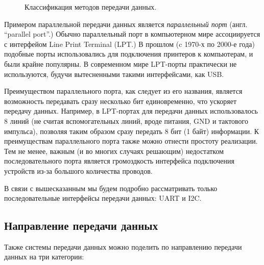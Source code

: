 \documentclass[../sparc.tex]{subfiles}
\begin{document}
\begin{figure}[H]
  \centering
  \caption{Классификация методов передачи данных.}
  \label{fig:communication-data-transfer-categories}
\end{figure}

Примером параллельной передачи данных является \emph{параллельный порт} (англ.
``parallel port''.) Обычно параллельный порт в компьютерном мире ассоциируется с
интерфейом Line Print Terminal (\gls{LPT}.)  В прошлом (c 1970-х по 2000-е года)
подобные порты использовались для подключения принтеров к компьютерам, и были
крайне популярны.  В современном мире LPT-порты практически не используются,
будучи вытесненными такими интерфейсами, как USB.

Преимуществом параллельного порта, как следует из его названия, является
возможность передавать сразу несколько бит единовременно, что ускоряет передачу
данных.  Например, в LPT-портах для передачи данных использовалось 8 линий (не
считая вспомогательных линий, вроде питания, GND и тактового импульса), позволяя
таким образом сразу передать 8 бит (1 байт) информации.  К преимуществам
параллельного порта также можно отнести простоту реализации.  Тем не менее,
важным (и во многих случаях решающим) недостатком последовательного порта
является громоздкость интерфейса подключения устройств из-за большого количества
проводов.

В связи с вышесказанным мы будем подробно рассматривать только последовательные
интерфейсы передачи данных: \gls{UART} и I2C.

\subsection{Направление передачи данных}

Также системы передачи данных можно поделить по направлению передачи данных на
три категории:
\end{document}
